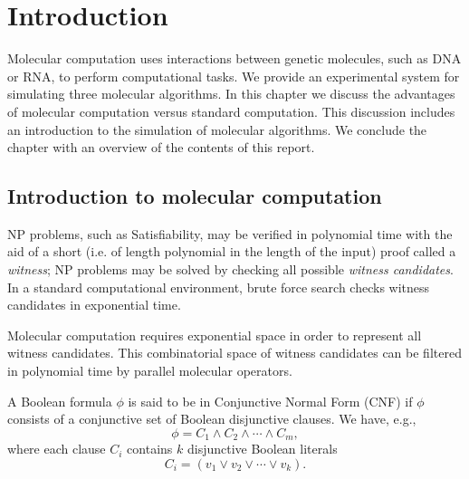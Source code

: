 \chapter{Introduction}


Molecular computation uses interactions between genetic molecules, such as DNA or RNA, to perform computational tasks.  We provide an experimental system for simulating three molecular algorithms.  In this chapter we discuss the advantages of molecular computation versus standard computation.  This discussion includes an introduction to the simulation of molecular algorithms.  We conclude the chapter with an overview of the contents of this report.

\section{Introduction to molecular computation}
	
				
\textsf{NP} problems, such as {\sc Satisfiability}, may be verified in polynomial time with the aid of a short (i.e. of length polynomial in the length of the input) proof called a \textit{witness}; \textsf{NP} problems may be solved by checking all possible \textit{witness candidates}.  In a standard computational environment, brute force search checks witness candidates in exponential time.

Molecular computation requires exponential space in order to represent all witness candidates.  This combinatorial space of witness candidates can be filtered in polynomial time by parallel molecular operators.

A Boolean formula $\phi$ is said to be in Conjunctive Normal Form (CNF) if $\phi$ consists of a conjunctive set of Boolean disjunctive clauses.  We have, e.g.,
\[
\phi = C_1 \wedge C_2 \wedge \cdots \wedge C_m, 
\]
where each clause $C_i$ contains $k$ disjunctive Boolean literals
\[
C_i = (v_1 \vee v_2 \vee \cdots \vee v_k).
\]

